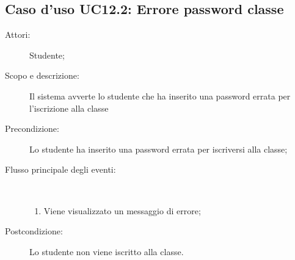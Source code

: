 \subsection{Caso d'uso UC12.2: Errore password classe}\begin{description}
	\item[Attori:] Studente;
	\item[Scopo e descrizione:] Il sistema avverte lo studente che ha inserito una password errata per l'iscrizione alla classe
	\item[Precondizione:] Lo studente ha inserito una password errata per iscriversi alla classe;
	
	\item[Flusso principale degli eventi:] \ 
	\begin{enumerate}
		\item Viene visualizzato un messaggio di errore;
		
	\end{enumerate}
	\item[Postcondizione:] Lo studente non viene iscritto alla classe.
\end{description}
\hypertarget{UC13}{}
